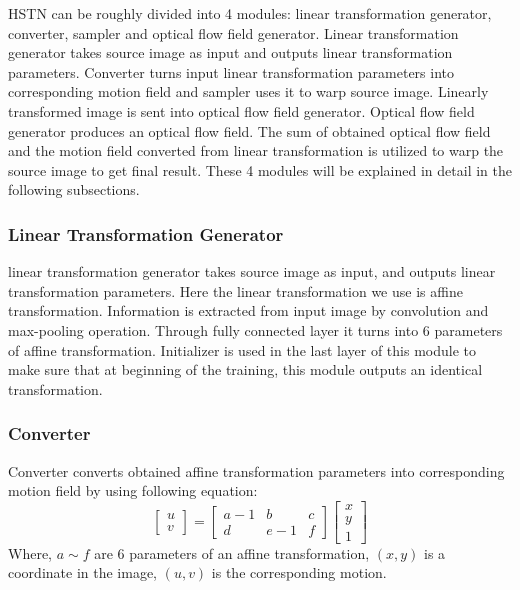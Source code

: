\documentclass{article}
\begin{document}
HSTN can be roughly divided into 4 modules: linear transformation generator, converter, sampler and optical flow field generator.
Linear transformation generator takes source image as input and outputs linear transformation parameters.
Converter turns input linear transformation parameters into corresponding motion field and sampler uses it to warp source image.
Linearly transformed image is sent into optical flow field generator.
Optical flow field generator produces an optical flow field.
The sum of obtained optical flow field and the motion field converted from linear transformation is utilized to warp the source image to get final result.
These 4 modules will be explained in detail in the following subsections.

\subsubsection{Linear Transformation Generator}
linear transformation generator takes source image as input, and outputs linear transformation parameters.
Here the linear transformation we use is affine transformation.
Information is extracted from input image by convolution and max-pooling operation.
Through fully connected layer it turns into 6 parameters of affine transformation.
Initializer is used in the last layer of this module to make sure that at beginning of the training, this module outputs an identical transformation.

\subsubsection{Converter}
Converter converts obtained affine transformation parameters into corresponding motion field by using following equation:
\begin{equation}\label{5}
\left[ {\begin{array}{*{20}{c}}
u\\
v
\end{array}} \right] = \left[{\begin{array}{*{20}{c}}
{a - 1}&b&c\\
d&{e - 1}&f
\end{array}} \right]\left[{\begin{array}{*{20}{c}}
x\\
y\\
1
\end{array}} \right]
\end{equation}
Where, $a \sim f$ are 6 parameters of an affine transformation, $(x,y)$ is a coordinate in the image, $(u,v)$ is the corresponding motion.
\end{document}
